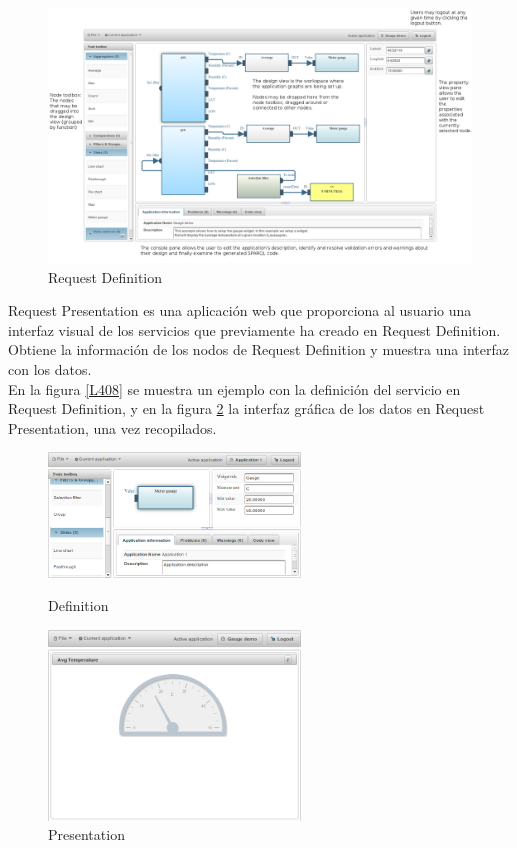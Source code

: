\documentclass[12pt, twoside]{book}
\begin{document}
\begin{figure}[H]
\centering
\includegraphics[scale=0.3]{images/requestDefinition}
\caption{Request Definition}\label{L407}
\end{figure}
Request Presentation es una aplicación web que proporciona al usuario una interfaz visual de los servicios que previamente ha creado en Request Definition. Obtiene la información de los nodos de Request Definition y muestra una interfaz con los datos. \\
En la figura \ref{L408} se muestra un ejemplo con la definición del servicio en Request Definition, y en la figura \ref{L409} la interfaz gráfica de los datos en Request Presentation, una vez recopilados.
\begin{figure}[H] 
\hfill
\begin{minipage}[t]{.45\textwidth}
\begin{center}
\includegraphics[width=190pt]{images/temperature_definition}
\caption{Definition}
\label{L408}
\end{center}
\end{minipage}
\hfill
\begin{minipage}[t]{.45\textwidth}
\begin{center}
\includegraphics[width=190pt]{images/temperature_presentation}
\caption{Presentation}
\label{L409}
\end{center}
\end{minipage}
\hfill
\end{figure}
\end{document}
